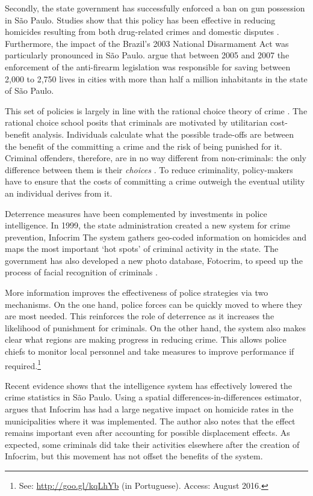 Secondly, the state government has successfully enforced a ban on gun possession in São Paulo. Studies show that this policy has been effective in reducing homicides resulting from both drug-related crimes and domestic disputes \citep{goertzel2009, kahn2005papel}. Furthermore, the impact of the Brazil's 2003 National Disarmament Act was particularly pronounced in São Paulo. \citet{cerqueira2013evaluating} argue that between 2005 and 2007 the enforcement of the anti-firearm legislation was responsible for saving between 2,000 to 2,750 lives in cities with more than half a million inhabitants in the state of São Paulo. 

This set of policies is largely in line with the rational choice theory of crime \citep[e.g.][]{becker1968crime, ehrlich1973participation,levitt1996effect, levitt1997using, paternoster2010much}. The rational choice school posits that criminals are motivated by utilitarian cost-benefit analysis. Individuals calculate what the possible trade-offs are between the benefit of the committing a crime and the risk of being punished for it. Criminal offenders, therefore, are in no way different from non-criminals: the only difference between them is their \emph{choices} \citep{nagin2007moving}. To reduce criminality, policy-makers have to ensure that the costs of committing a crime outweigh the eventual utility an individual derives from it.

Deterrence measures have been complemented by investments in police intelligence. In 1999, the state administration created a new system for crime prevention, Infocrim \citep[p. 3]{risso2014intentional} The system gathers geo-coded information on homicides and maps the most important `hot spots' of criminal activity in the state. The government has also developed a new photo database, Fotocrim, to speed up the process of facial recognition of criminals \citep[p. 3]{mello2010}. 

More information improves the effectiveness of police strategies via two mechanisms. On the one hand, police forces can be quickly moved to where they are most needed. This reinforces the role of deterrence as it increases the likelihood of punishment for criminals. On the other hand, the system also makes clear what regions are making progress in reducing crime. This allows police chiefs to monitor local personnel and take measures to improve performance if required.\footnote{See: \url{http://goo.gl/kqLhYb} (in Portuguese). Access: August 2016.} 

Recent evidence shows that the intelligence system has effectively lowered the crime statistics in São Paulo. Using a spatial differences-in-differences estimator, \citet{cabral2016infocrim} argues that Infocrim has had a large negative impact on homicide rates in the municipalities where it was implemented. The author also notes that the effect remains important even after accounting for possible displacement effects. As expected, some criminals did take their activities elsewhere after the creation of Infocrim, but this movement has not offset the benefits of the system.

